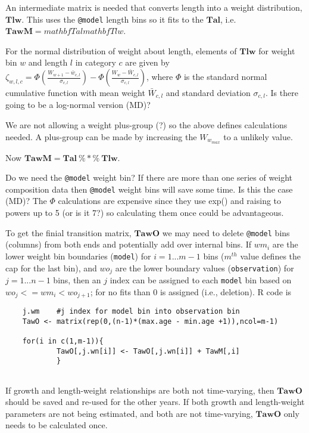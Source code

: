 \documentclass[a4paper,11pt,twoside,pdftex,draft]{article}
\begin{document}
An intermediate matrix is needed that converts length into a weight distribution, $\mathbf{Tlw}$. This uses the \texttt{@model} length bins so it fits to the $\mathbf{Tal}$, i.e. $\mathbf{TawM} =mathbf{Tal} mathbf{Tlw} $.

For the normal distribution of weight about length, 
elements of $\mathbf{Tlw}$ for weight bin $w$ and length $l$ in category $c$ are given by $\zeta_{w,l,c} = \Phi\left( \frac{W_{w+1} - \bar w_{c,l}   }{\sigma_{c,l}} \right)   - \Phi\left( \frac{W_{w} - \bar W_{c,l}   }{\sigma_{c,l}} \right)  $,
where $\Phi$ is the standard normal cumulative function with mean weight $\bar W_{c,l}$ and standard deviation $\sigma_{c,l}$. Is there going to be a log-normal version (MD)? 

We are not allowing a weight plus-group (?) so the above defines calculations needed. A  plus-group can be made by increasing the $W_{w_{max}}$ to a unlikely value.

Now  $\mathbf{TawM} =\mathbf{Tal} \ \%*\%\ \mathbf{Tlw} $.

Do we need the \texttt{@model} weight bin? If there are more than one series of weight composition data then \texttt{@model} weight bins will save some time. Is this the case (MD)? The $\Phi$ calculations are expensive since they use exp() and raising to powers up to 5 (or is it 7?) so calculating them once could be advantageous. 


To get the finial transition matrix, $\mathbf{TawO}$ we may need to delete \texttt{@model} bins (columns) from both ends and potentially add over internal bins. If $wm_{i}$ are the lower weight bin boundaries (\texttt{model}) for $i=1 ... m-1$ bins ($m^{th}$ value defines the cap for the last bin), and $wo_{j}$ are the lower boundary values  (\texttt{observation}) for  $j=1 ... n-1$ bins, then an $j$ index can be assigned to each \texttt{model} bin based on $wo_{j} <= wm_{i} <wo_{j+1}$; for no fits than 0 is assigned (i.e., deletion). R code is
\begin{verbatim}
    j.wm	#j index for model bin into observation bin
    TawO <- matrix(rep(0,(n-1)*(max.age - min.age +1)),ncol=m-1)
	
    for(i in c(1,m-1)){
    	    TawO[,j.wn[i]] <- TawO[,j.wn[i]] + TawM[,i]
        	}
		
\end{verbatim}

If growth and length-weight relationships are both not time-varying, then $\mathbf{TawO}$ should be saved and re-used for the other years. If both growth and length-weight parameters are not being estimated, and both are not time-varying, $\mathbf{TawO}$ only needs to be calculated once.
\end{document}
